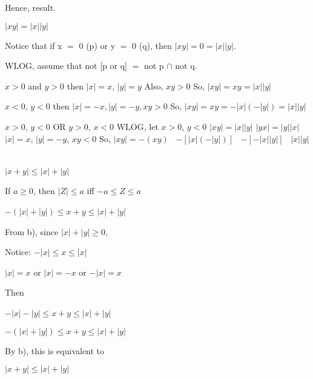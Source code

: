 \documentclass{article}
\begin{document}
Hence, result.

 $|xy| = |x||y|$

Notice that if x $=$ 0 (p) or y $=$ 0 (q), then $|xy| = 0 = |x||y|$.

WLOG, assume that not [p or q] $=$ not p $\cap$ not q.

\bilist
\item $x > 0$ and $y > 0$
	then $|x| = x$, $|y| = y$
	Also, $xy > 0$
	So, $|xy| = xy = |x||y|$
\item $x < 0$, $y < 0$
	then $|x| = -x, |y| = -y, xy > 0$
	So, $|xy| = xy = -|x|(-|y|) = |x||y|$
\item $x > 0$, $y < 0$ OR $y > 0$, $x < 0$
	WLOG, let $x > 0$, $y < 0$
	$|xy| = |x||y|$
	$|yx| = |y||x|$
	$|x| = x$, $|y| = -y$, $xy < 0$
	So, $|xy| = -(xy)$ \
		$-[|x|(-|y|)]$ \ 
		$-[-|x||y|]$ \
		$|x||y|$ \ 
\elist
	
 $|x + y| \leq |x| + |y|$ \


If $a \geq 0$, then $|Z| \leq a$ iff $-a \leq Z \leq a$

$-(|x| + |y|) \leq x + y \leq |x| + |y|$ \

From b), since $|x| + |y| \geq 0$,


Notice: $-|x| \leq x \leq |x|$

$|x| = x$ or $|x| = -x$ or $-|x| = x$ \

Then \

$-|x| - |y| \leq x + y \leq |x| + |y|$ \

$-(|x| + |y|) \leq x + y \leq |x| + |y|$

By b), this is equivalent to \

$|x + y| \leq |x| + |y|$

\epf
\end{document}
